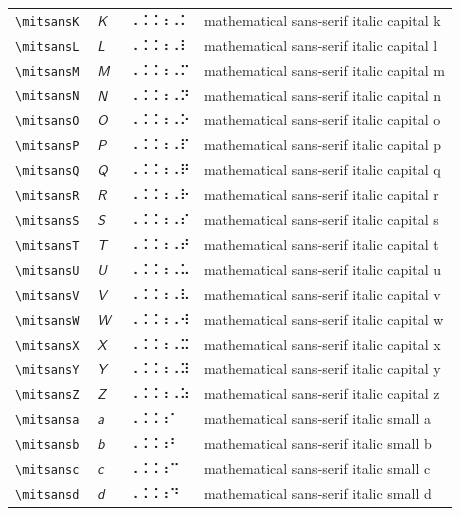 \documentclass[oneside]{article}
\begin{document}
\begin{longtable}{llll}
\verb|\mitsansK| & $\mitsansK$ &  ⠠⠨⠨⠰⠠⠅  & {mathematical sans-serif italic capital k} \\[2ex]
\verb|\mitsansL| & $\mitsansL$ &  ⠠⠨⠨⠰⠠⠇  & {mathematical sans-serif italic capital l} \\[2ex]
\verb|\mitsansM| & $\mitsansM$ &  ⠠⠨⠨⠰⠠⠍  & {mathematical sans-serif italic capital m} \\[2ex]
\verb|\mitsansN| & $\mitsansN$ &  ⠠⠨⠨⠰⠠⠝  & {mathematical sans-serif italic capital n} \\[2ex]
\verb|\mitsansO| & $\mitsansO$ &  ⠠⠨⠨⠰⠠⠕  & {mathematical sans-serif italic capital o} \\[2ex]
\verb|\mitsansP| & $\mitsansP$ &  ⠠⠨⠨⠰⠠⠏  & {mathematical sans-serif italic capital p} \\[2ex]
\verb|\mitsansQ| & $\mitsansQ$ &  ⠠⠨⠨⠰⠠⠟  & {mathematical sans-serif italic capital q} \\[2ex]
\verb|\mitsansR| & $\mitsansR$ &  ⠠⠨⠨⠰⠠⠗  & {mathematical sans-serif italic capital r} \\[2ex]
\verb|\mitsansS| & $\mitsansS$ &  ⠠⠨⠨⠰⠠⠎  & {mathematical sans-serif italic capital s} \\[2ex]
\verb|\mitsansT| & $\mitsansT$ &  ⠠⠨⠨⠰⠠⠞  & {mathematical sans-serif italic capital t} \\[2ex]
\verb|\mitsansU| & $\mitsansU$ &  ⠠⠨⠨⠰⠠⠥  & {mathematical sans-serif italic capital u} \\[2ex]
\verb|\mitsansV| & $\mitsansV$ &  ⠠⠨⠨⠰⠠⠧  & {mathematical sans-serif italic capital v} \\[2ex]
\verb|\mitsansW| & $\mitsansW$ &  ⠠⠨⠨⠰⠠⠺  & {mathematical sans-serif italic capital w} \\[2ex]
\verb|\mitsansX| & $\mitsansX$ &  ⠠⠨⠨⠰⠠⠭  & {mathematical sans-serif italic capital x} \\[2ex]
\verb|\mitsansY| & $\mitsansY$ &  ⠠⠨⠨⠰⠠⠽  & {mathematical sans-serif italic capital y} \\[2ex]
\verb|\mitsansZ| & $\mitsansZ$ &  ⠠⠨⠨⠰⠠⠵  & {mathematical sans-serif italic capital z} \\[2ex]
\verb|\mitsansa| & $\mitsansa$ &  ⠠⠨⠨⠰⠁  & {mathematical sans-serif italic small a} \\[2ex]
\verb|\mitsansb| & $\mitsansb$ &  ⠠⠨⠨⠰⠃  & {mathematical sans-serif italic small b} \\[2ex]
\verb|\mitsansc| & $\mitsansc$ &  ⠠⠨⠨⠰⠉  & {mathematical sans-serif italic small c} \\[2ex]
\verb|\mitsansd| & $\mitsansd$ &  ⠠⠨⠨⠰⠙  & {mathematical sans-serif italic small d} \\[2ex]

\end{longtable}
\end{document}
